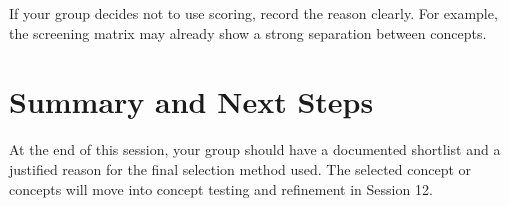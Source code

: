 If your group decides not to use scoring, record the reason clearly. For example, the screening matrix may already show a strong separation between concepts.

\section{Summary and Next Steps}

At the end of this session, your group should have a documented shortlist and a justified reason for the final selection method used. The selected concept or concepts will move into concept testing and refinement in Session 12.
